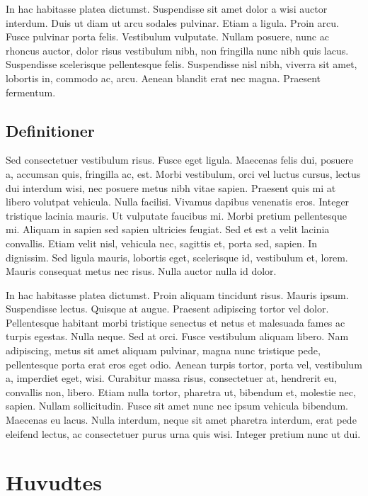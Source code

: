 \documentclass[a4paper,11pt]{kth-mag}
\begin{document}
In hac habitasse platea dictumst. Suspendisse sit amet dolor a wisi
auctor interdum. Duis ut diam ut arcu sodales pulvinar. Etiam a
ligula. Proin arcu. Fusce pulvinar porta felis. Vestibulum vulputate.
Nullam posuere, nunc ac rhoncus auctor, dolor risus vestibulum nibh,
non fringilla nunc nibh quis lacus. Suspendisse scelerisque
pellentesque felis. Suspendisse nisl nibh, viverra sit amet, lobortis
in, commodo ac, arcu. Aenean blandit erat nec magna. Praesent
fermentum.

\subsection{Definitioner}

Sed consectetuer vestibulum risus. Fusce eget ligula. Maecenas felis
dui, posuere a, accumsan quis, fringilla ac, est. Morbi vestibulum,
orci vel luctus cursus, lectus dui interdum wisi, nec posuere metus
nibh vitae sapien. Praesent quis mi at libero volutpat vehicula. Nulla
facilisi. Vivamus dapibus venenatis eros. Integer tristique lacinia
mauris. Ut vulputate faucibus mi. Morbi pretium pellentesque mi.
Aliquam in sapien sed sapien ultricies feugiat. Sed et est a velit
lacinia convallis. Etiam velit nisl, vehicula nec, sagittis et, porta
sed, sapien. In dignissim. Sed ligula mauris, lobortis eget,
scelerisque id, vestibulum et, lorem. Mauris consequat metus nec
risus. Nulla auctor nulla id dolor.

In hac habitasse platea dictumst. Proin aliquam tincidunt risus.
Mauris ipsum. Suspendisse lectus. Quisque at augue. Praesent
adipiscing tortor vel dolor. Pellentesque habitant morbi tristique
senectus et netus et malesuada fames ac turpis egestas. Nulla neque.
Sed at orci. Fusce vestibulum aliquam libero. Nam adipiscing, metus
sit amet aliquam pulvinar, magna nunc tristique pede, pellentesque
porta erat eros eget odio. Aenean turpis tortor, porta vel, vestibulum
a, imperdiet eget, wisi. Curabitur massa risus, consectetuer at,
hendrerit eu, convallis non, libero. Etiam nulla tortor, pharetra ut,
bibendum et, molestie nec, sapien. Nullam sollicitudin. Fusce sit amet
nunc nec ipsum vehicula bibendum. Maecenas eu lacus. Nulla interdum,
neque sit amet pharetra interdum, erat pede eleifend lectus, ac
consectetuer purus urna quis wisi. Integer pretium nunc ut dui.

\section{Huvudtes}
\end{document}
